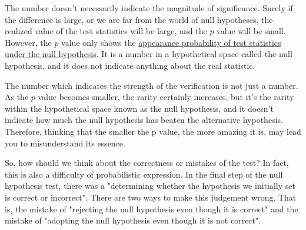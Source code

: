 \documentclass{ltjsbook}
\begin{document}
The number doesn't necessarily indicate the magnitude of significance. Surely if the difference is large, or we are far from the world of null hypotheses, the realized value of the test statistics will be large, and the $p$ value will be small. However, the $p$ value only shows the \underline{appearance probability of test statistics under the null hypothesis}. It is a number in a hypothetical space called the null hypothesis, and it does not indicate anything about the real statistic.

The number which indicates the strength of the verification is not just a number. As the $p$ value becomes smaller, the rarity certainly increases, but it's the rarity within the hypothetical space known as the null hypothesis, and it doesn't indicate how much the null hypothesis has beaten the alternative hypothesis. Therefore, thinking that the smaller the p value, the more amazing it is, may lead you to misunderstand its essence.

So, how should we think about the correctness or mistakes of the test? In fact, this is also a difficulty of probabilistic expression.
In the final step of the null hypothesis test, there was a "determining whether the hypothesis we initially set is correct or incorrect". There are two ways to make this judgement wrong. That is, the mistake of "rejecting the null hypothesis even though it is correct" and the mistake of "adopting the null hypothesis even though it is not correct".
\end{document}
